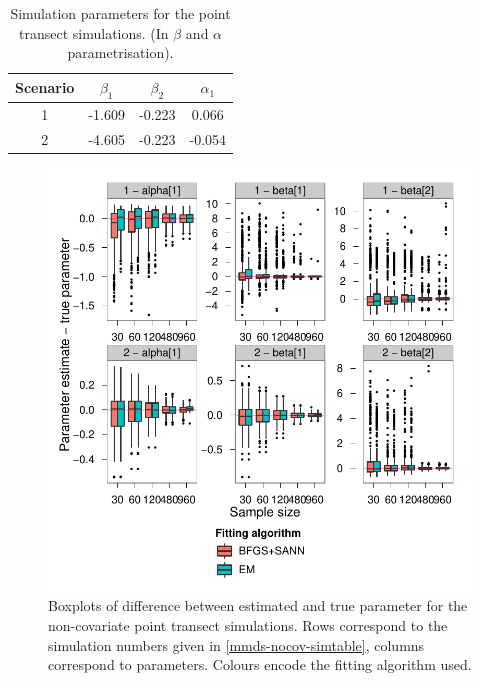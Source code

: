 \begin{table}[ht]
\centering
\begin{tabular}{c c c c}
Scenario & $\beta_1$ & $\beta_2$ & $\alpha_1$\\
\hline
\hline
1 & -1.609 & -0.223 & 0.066\\
2 & -4.605 & -0.223 & -0.054\\
\end{tabular}
\label{mmds-pt-simtable}
\caption{Simulation parameters for the point transect simulations. (In $\beta$ and $\alpha$ parametrisation).}
\end{table}

\begin{figure}[hp]
\centering
\includegraphics[width=5in]{mix/figs/pt-boxplots.pdf}
\caption{Boxplots of difference between estimated and true parameter for the non-covariate point transect simulations. Rows correspond to the simulation numbers given in \ref{mmds-nocov-simtable}, columns correspond to parameters. Colours encode the fitting algorithm used.}
\label{mmds-pt-boxplots}
\end{figure}

